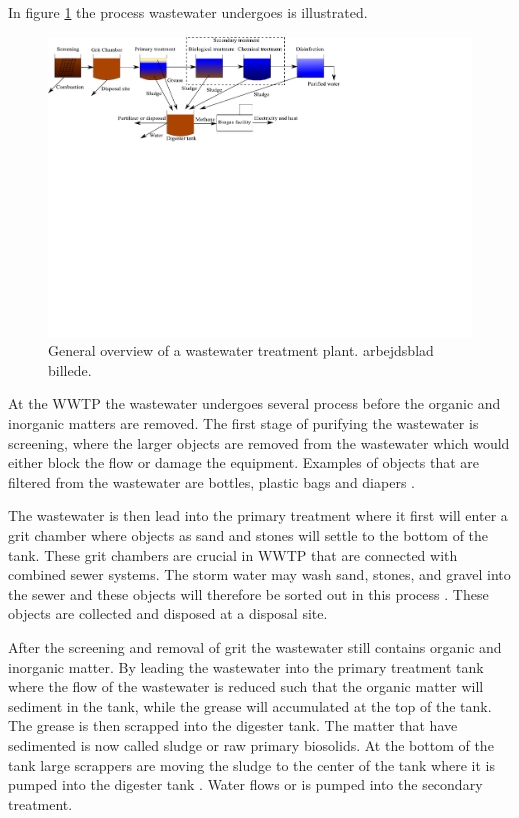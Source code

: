 In figure \ref{fig:wwtp_process} the process wastewater undergoes is illustrated. 
\begin{figure}[H]
\centering
\includegraphics[clip, trim=0cm 13cm 9cm 0cm, width=1.00\textwidth]{report/introduction/pictures/WWTP_overview}
\caption{General overview of a wastewater treatment plant. arbejdsblad billede. }
\label{fig:wwtp_process}
\end{figure}

At the WWTP the wastewater undergoes several process before the organic and inorganic matters are removed. The first stage of purifying the wastewater is screening, where the larger objects are removed from the wastewater which would either block the flow or damage the equipment. Examples of objects that are filtered from the wastewater are bottles, plastic bags and diapers \cite{wwtp_process}. %

The wastewater is then lead into the primary treatment where it first will enter a grit chamber where objects as sand and stones will settle to the bottom of the tank. These grit chambers are crucial in WWTP that are connected with combined sewer systems.%
The storm water may wash sand, stones, and gravel into the sewer and these objects will therefore be sorted out in this process \cite{epa_wwtp}. These objects are collected and disposed at a disposal site. 

After the screening and removal of grit the wastewater still contains organic and inorganic matter. By leading the wastewater into the primary treatment tank where the flow of the wastewater is reduced such that the organic matter will sediment in the tank, while the grease will accumulated at the top of the tank. The grease is then scrapped into the digester tank. The matter that have sedimented is now called sludge or raw primary biosolids. At the bottom of the tank large scrappers are moving the sludge to the center of the  tank where it is pumped into the digester tank \cite{epa_wwtp}. Water flows or is pumped into the secondary treatment. 

